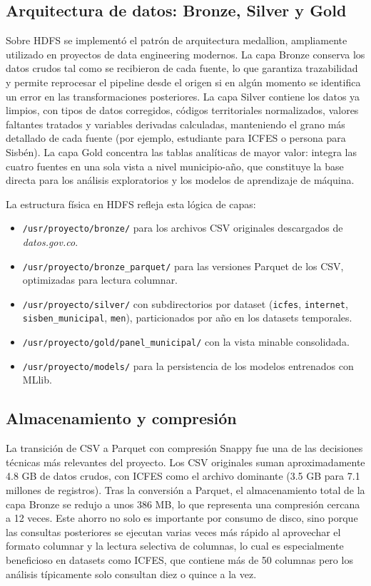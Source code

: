 \subsection{Arquitectura de datos: Bronze, Silver y Gold}
Sobre HDFS se implementó el patrón de arquitectura medallion, ampliamente utilizado en proyectos de data engineering modernos. La capa Bronze conserva los datos crudos tal como se recibieron de cada fuente, lo que garantiza trazabilidad y permite reprocesar el pipeline desde el origen si en algún momento se identifica un error en las transformaciones posteriores. La capa Silver contiene los datos ya limpios, con tipos de datos corregidos, códigos territoriales normalizados, valores faltantes tratados y variables derivadas calculadas, manteniendo el grano más detallado de cada fuente (por ejemplo, estudiante para ICFES o persona para Sisbén). La capa Gold concentra las tablas analíticas de mayor valor: integra las cuatro fuentes en una sola vista a nivel municipio-año, que constituye la base directa para los análisis exploratorios y los modelos de aprendizaje de máquina.

La estructura física en HDFS refleja esta lógica de capas:
\begin{itemize}
    \item \texttt{/usr/proyecto/bronze/} para los archivos CSV originales descargados de \textit{datos.gov.co}.
    \item \texttt{/usr/proyecto/bronze\_parquet/} para las versiones Parquet de los CSV, optimizadas para lectura columnar.
    \item \texttt{/usr/proyecto/silver/} con subdirectorios por dataset (\texttt{icfes}, \texttt{internet}, \texttt{sisben\_municipal}, \texttt{men}), particionados por año en los datasets temporales.
    \item \texttt{/usr/proyecto/gold/panel\_municipal/} con la vista minable consolidada.
    \item \texttt{/usr/proyecto/models/} para la persistencia de los modelos entrenados con MLlib.
\end{itemize}

\subsection{Almacenamiento y compresión}
La transición de CSV a Parquet con compresión Snappy fue una de las decisiones técnicas más relevantes del proyecto. Los CSV originales suman aproximadamente 4.8 GB de datos crudos, con ICFES como el archivo dominante (3.5 GB para 7.1 millones de registros). Tras la conversión a Parquet, el almacenamiento total de la capa Bronze se redujo a unos 386 MB, lo que representa una compresión cercana a 12 veces. Este ahorro no solo es importante por consumo de disco, sino porque las consultas posteriores se ejecutan varias veces más rápido al aprovechar el formato columnar y la lectura selectiva de columnas, lo cual es especialmente beneficioso en datasets como ICFES, que contiene más de 50 columnas pero los análisis típicamente solo consultan diez o quince a la vez.

